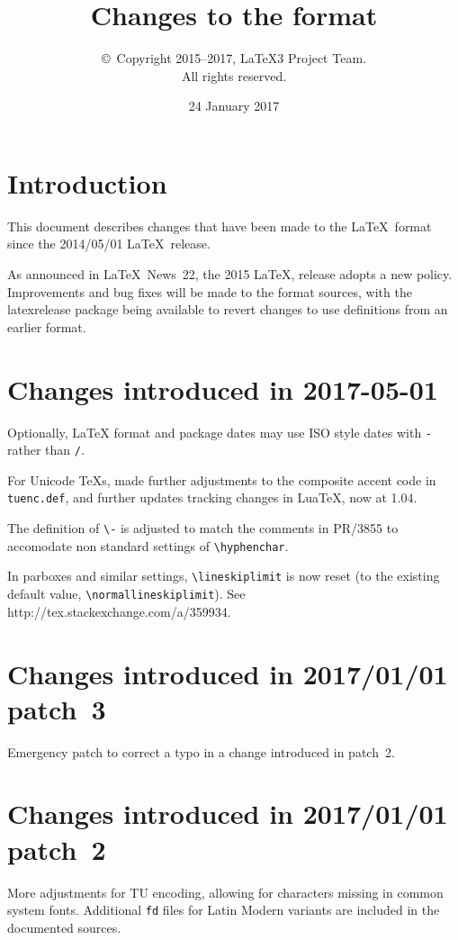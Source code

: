 \documentclass{ltxguide}
\title{Changes to the \LaTeXe{} format}
\author{\copyright~Copyright 2015--2017, \LaTeX3 Project Team.\\
   All rights reserved.}
\date{24 January 2017}
\newcommand\Lpack[1]{\mbox{\textsf{#1}}}
\begin{document}
 
\maketitle
 
\tableofcontents

\newpage
 
\section{Introduction}
 
This document describes changes that have been made to the \LaTeX\ format since the 2014/05/01 \LaTeX\ release.

As announced in \LaTeX\ News~22, the 2015 \LaTeX, release adopts a new
policy. Improvements and bug fixes will be made to the format sources,
with the \Lpack{latexrelease} package being available to revert
changes to use definitions from an earlier format.

\section{Changes  introduced in 2017-05-01}
Optionally, \LaTeX{} format and package dates may use ISO style dates with
\texttt{-}  rather than \texttt{/}.

For Unicode \TeX{}s, made further adjustments to the composite accent
code in \texttt{tuenc.def}, and further updates tracking changes in
Lua\TeX, now at 1.04.

The definition of \verb|\-| is adjusted to match the comments in
PR/3855 to accomodate non standard settings of \verb|\hyphenchar|.

In parboxes and similar settings, \verb|\lineskiplimit| is now
reset (to the existing default value, \verb|\normallineskiplimit|).
See http://tex.stackexchange.com\slash a\slash 359934.


\section{Changes  introduced in 2017/01/01 patch~3}
Emergency patch to correct a typo in a change introduced in patch~2.

\section{Changes  introduced in 2017/01/01 patch~2}
More adjustments for TU encoding, allowing for characters missing in
common system fonts. Additional \texttt{fd} files
for Latin Modern variants are included in the documented sources.
\end{document}
